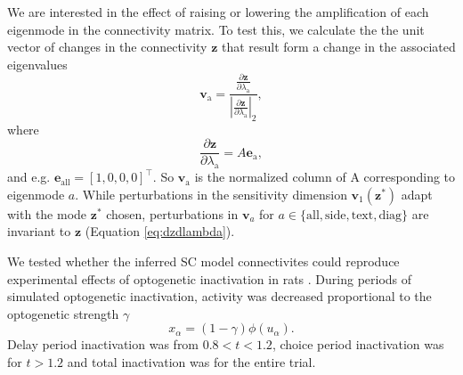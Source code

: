 \documentclass[11pt]{article}
\begin{document}
We are interested in the effect of raising or lowering the amplification of each eigenmode in the connectivity matrix.
To test this, we calculate the the unit vector of changes in the connectivity $\mathbf{z}$ that result form a change in the associated eigenvalues
\begin{equation}
\mathbf{v}_{\text{a}} = \frac{\frac{\partial \mathbf{z}}{\partial \lambda_{\text{a}}}}{|\frac{\partial \mathbf{z}}{\partial \lambda_{\text{a}}}|_2},
\end{equation}
where
\begin{equation} \label{eq:dzdlambda}
\frac{\partial \mathbf{z}}{\partial \lambda_{\text{a}}} = A\mathbf{e}_{\text{a}},
\end{equation}
and e.g. $\mathbf{e}_{\text{all}} = [1, 0, 0, 0]^\top$.
So $\mathbf{v}_{\text{a}}$ is the normalized column of A corresponding to eigenmode $a$.
While perturbations in the sensitivity dimension $\mathbf{v}_1(\mathbf{z}^*)$ adapt with the mode $\mathbf{z}^*$ chosen, perturbations in $\mathbf{v}_a$ for $a \in \{\text{all}, \text{side}, \text{text}, \text{diag}\}$ are invariant to $\mathbf{z}$ (Equation \ref{eq:dzdlambda}).
%

We tested whether the inferred SC model connectivites could reproduce experimental effects of optogenetic inactivation in rats \cite{duan2015requirement}.
During periods of simulated optogenetic inactivation, activity was decreased proportional to the optogenetic strength $\gamma$
\begin{equation}
x_\alpha = (1-\gamma)\phi(u_\alpha).
\end{equation}
Delay period inactivation was from $0.8 < t < 1.2$, choice period inactivation was for $t > 1.2$ and total inactivation was for the entire trial.
\end{document}
